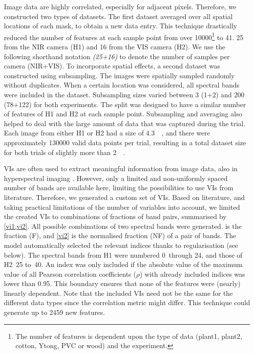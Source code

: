 \documentclass[10pt,authoryear,a4paper]{elsarticle}
\begin{document}
        Image data are highly correlated, especially for adjacent pixels. Therefore, we constructed two types of datasets. The first dataset averaged over all spatial locations of each mask, to obtain a new data entry. This technique drastically reduced the number of features at each sample point from over \num{10000}\footnote{The number of features is dependent upon the type of data (plant1, plant2, cotton, Ytong, PVC or wood) and the experiment.} to 41. 25 from the NIR camera (H1) and 16 from the VIS camera (H2). We use the following shorthand notation \emph{(25+16)} to denote the number of samples per camera (NIR+VIS). To incorporate spatial effects, a second dataset was constructed using subsampling. The images were spatially sampled randomly without duplicates. When a certain location was considered, all spectral bands were included in the dataset. Subsampling sizes varied between 3 (1+2) and 200 (78+122) for both experiments. The split was designed to have a similar number of features of H1 and H2 at each sample point. Subsampling and averaging also helped to deal with the large amount of data that was captured during the trial. Each image from either H1 or H2 had a size of \SI{4.3}{\mega\byte}, and there were approximately \num{130000} valid data points per trial, resulting in a total dataset size for both trials of slightly more than \SI{2}{\tera\byte}. 
        
        VIs are often used to extract meaningful information from image data, also in hyperspectral imaging \citep{vogelmannRed1993,rouseMonitoring1974,gitelsonSpectral1994,simsRelationships2002,gamonNarrowwaveband1992,behmannDetection2014,jinHyperspectral2016,gaoRecognising2018,alonsoDiurnal2017}. However, only a limited and non-uniformly spaced number of bands are available here, limiting the possibilities to use VIs from literature. Therefore, we generated a custom set of VIs. Based on literature, and taking practical limitations of the number of variables into account, we limited the created VIs to combinations of fractions of band pairs, summarised by \cref{vi1,vi2}. All possible combinations of two spectral bands were generated.  is the fraction (F), and \cref{vi2} is the normalised fraction (NF) of a pair of bands. The model automatically selected the relevant indices thanks to regularisation (see below). The spectral bands from H1 were numbered 0~through 24, and those of H2~25 to~40. An index was only included if the absolute value of the maximum value of all Pearson correlation coefficients ($\rho$) with already included indices was lower than 0.95. This boundary ensures that none of the features were (nearly) linearly dependent. Note that the included VIs need not be the same for the different data types since the correlation metric might differ. This technique could generate up to 2459 new features.
        
\end{document}
